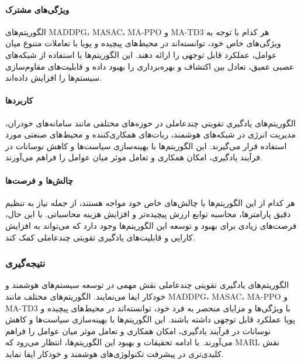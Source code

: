 \paragraph{ویژگی‌های مشترک}
الگوریتم‌های MADDPG، MASAC، MA-PPO و MA-TD3 هر کدام با توجه به ویژگی‌های خاص خود، توانسته‌اند در محیط‌های پیچیده و پویا با تعاملات متنوع میان عوامل، عملکرد قابل توجهی را ارائه دهند. این الگوریتم‌ها با استفاده از شبکه‌های عصبی عمیق، تعادل بین اکتشاف و بهره‌برداری را بهبود داده و قابلیت‌های مقاوم‌سازی سیستم‌ها را افزایش داده‌اند.

\paragraph{کاربردها}
الگوریتم‌های یادگیری تقویتی چندعاملی در حوزه‌های مختلفی مانند سامانه‌های خودران، مدیریت انرژی در شبکه‌های هوشمند، ربات‌های همکاری‌کننده و محیط‌های صنعتی مورد استفاده قرار می‌گیرند. این الگوریتم‌ها با بهینه‌سازی سیاست‌ها و کاهش نوسانات در فرآیند یادگیری، امکان همکاری و تعامل موثر میان عوامل را فراهم می‌آورند.

\paragraph{چالش‌ها و فرصت‌ها}
هر کدام از این الگوریتم‌ها با چالش‌های خاص خود مواجه هستند، از جمله نیاز به تنظیم دقیق پارامترها، محاسبه توابع ارزش پیچیده‌تر و افزایش هزینه محاسباتی. با این حال، فرصت‌های زیادی برای بهبود و توسعه این الگوریتم‌ها وجود دارد که می‌تواند به افزایش کارایی و قابلیت‌های یادگیری تقویتی چندعاملی کمک کند.

\subsubsection{نتیجه‌گیری}

الگوریتم‌های یادگیری تقویتی چندعاملی نقش مهمی در توسعه سیستم‌های هوشمند و خودکار ایفا می‌نمایند. الگوریتم‌های مختلف مانند MADDPG، MASAC، MA-PPO و MA-TD3 با ویژگی‌ها و مزایای منحصر به فرد خود، توانسته‌اند در محیط‌های پیچیده و پویا عملکرد قابل توجهی داشته باشند. این الگوریتم‌ها با بهینه‌سازی سیاست‌ها و کاهش نوسانات در فرآیند یادگیری، امکان همکاری و تعامل موثر میان عوامل را فراهم می‌آورند. با ادامه تحقیقات و بهبود این الگوریتم‌ها، انتظار می‌رود که MARL نقش کلیدی‌تری در پیشرفت تکنولوژی‌های هوشمند و خودکار ایفا نماید.
